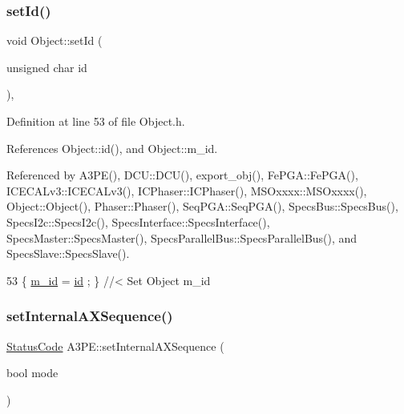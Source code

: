\subsubsection{\texorpdfstring{set\+Id()}{setId()}}
{\footnotesize\ttfamily void Object\+::set\+Id (\begin{DoxyParamCaption}\item[{unsigned char}]{id }\end{DoxyParamCaption})\hspace{0.3cm}{\ttfamily [inline]}, {\ttfamily [inherited]}}



Definition at line 53 of file Object.\+h.



References Object\+::id(), and Object\+::m\+\_\+id.



Referenced by A3\+P\+E(), D\+C\+U\+::\+D\+C\+U(), export\+\_\+obj(), Fe\+P\+G\+A\+::\+Fe\+P\+G\+A(), I\+C\+E\+C\+A\+Lv3\+::\+I\+C\+E\+C\+A\+Lv3(), I\+C\+Phaser\+::\+I\+C\+Phaser(), M\+S\+Oxxxx\+::\+M\+S\+Oxxxx(), Object\+::\+Object(), Phaser\+::\+Phaser(), Seq\+P\+G\+A\+::\+Seq\+P\+G\+A(), Specs\+Bus\+::\+Specs\+Bus(), Specs\+I2c\+::\+Specs\+I2c(), Specs\+Interface\+::\+Specs\+Interface(), Specs\+Master\+::\+Specs\+Master(), Specs\+Parallel\+Bus\+::\+Specs\+Parallel\+Bus(), and Specs\+Slave\+::\+Specs\+Slave().


\begin{DoxyCode}
53 \{ \hyperlink{classObject_aca74b9dbfed7b5556ea2d56c65b6b6b0}{m\_id}    = \hyperlink{classObject_af99145335cc61ff6e2798ea17db009d2}{id}    ; \} \textcolor{comment}{//< Set Object m\_id}
\end{DoxyCode}
\mbox{\label{classA3PE_ad5f953a38661104a87834cc8a63252fa}} 
\subsubsection{\texorpdfstring{set\+Internal\+A\+X\+Sequence()}{setInternalAXSequence()}}
{\footnotesize\ttfamily \hyperlink{classStatusCode}{Status\+Code} A3\+P\+E\+::set\+Internal\+A\+X\+Sequence (\begin{DoxyParamCaption}\item[{bool}]{mode }\end{DoxyParamCaption})}




